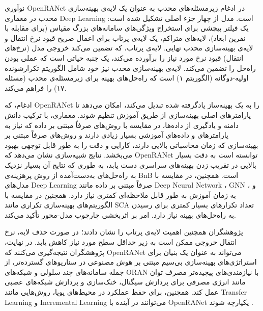 نوآوری OpenRANet در ادغام زیرمسئله‌های محدب به عنوان یک لایه‌ی بهینه‌سازی محدب در معماری 
\gls{Deep Learning}
 است.  مدل از چهار جزء اصلی تشکیل شده است: یک فیلتر پیچشی برای استخراج ویژگی‌های سامانه‌های بزرگ ‌مقیاس (برای مقابله با نفرین ابعاد)، لایه‌های متراکم، یک لایه‌ی پرتاب برای اعمال صریح قیود نرخ انتقال و لایه‌ی بهینه‌سازی محدب نهایی. لایه‌ی پرتاب، که تضمین می‌کند خروجی مدل (نرخ‌های انتقال) قیود نرخ مورد نیاز را برآورده می‌کند، یک جنبه حیاتی است که عملی بودن راه‌حل را تضمین می‌کند. لایه‌ی بهینه‌سازی محدب نیز خود شامل الگوریتم تکرارشونده اولیه-دوگانه (الگوریتم ۱) است که راه‌حل‌های بهینه برای زیرمسئله‌ی محدب (مسئله ۱۷) را فراهم می‌کند.
 
 ادغام، که OpenRANet را به یک بهینه‌ساز یادگرفته شده تبدیل می‌کند، امکان می‌دهد تا پارامترهای اصلی بهینه‌سازی از طریق آموزش تنظیم شوند.  معماری، با ترکیب دانش دامنه و یادگیری از داده‌ها، در مقایسه با روش‌های صرفاً مبتنی بر داده که نیاز به پارامترهای و داده‌های آموزشی بسیار زیادی دارند و روش‌های صرفاً مبتنی بر بهینه‌سازی که زمان محاسباتی بالایی دارند، کارایی و دقت را به طور قابل توجهی بهبود می‌بخشد.
نتایج شبیه‌سازی نشان می‌دهد که OpenRANet توانسته‌ است به دقت بسیار بالایی در تقریب زدن بهینه‌های سراسری دست یابد، به طوری که نتایج آن بسیار نزدیک به راه‌حل‌های به‌دست‌آمده از روش پرهزینه‌ی 
\gls{BnB}
است. همچنین، در مقایسه با مدل‌های 
\gls{Deep Learning}
 صرفاً مبتنی بر داده مانند 
\gls{Deep Neural Network}
،
\gls{GNN} و 
، 
 به زمان آموزش به طور قابل ملاحظه‌ای کمتری نیاز دارد. همچنین 
  در مقایسه با الگوریتم‌های بهینه‌سازی تکراری مانند 
\gls{SCA}
تعداد تکرارهای بسیار کمتری برای رسیدن به راه‌حل‌های بهینه نیاز دارد.  امر بر اثربخشی چارچوب مدل-محور تأکید می‌کند. 

پژوهشگران همچنین اهمیت لایه‌ی پرتاب را نشان دادند؛ در صورت حذف  لایه، نرخ انتقال خروجی ممکن است به زیر حداقل سطح مورد نیاز کاهش یابد.
در نهایت، پژوهشگران نتیجه‌گیری می‌کنند که OpenRANet می‌تواند به عنوان یک بنیان برای استراتژی‌های بهینه‌سازی بی‌سیم مبتنی بر هوش مصنوعی در سناریوهای گسترده‌تر، از جمله سامانه‌های چند-سلولی و شبکه‌های ORAN با نیازمندی‌های پیچیده‌تر مصرف توان مانند انرژی مصرفی برای پردازش سیگنال، خنک‌سازی و پردازش شبکه‌های عصبی عمل کند. همچنین، برای حفظ عملکرد در محیط‌های پویا، روش‌هایی مانند 
\gls{Transfer Learning}
 و 
\gls{Incremental Learning}
 می‌توانند در آینده با OpenRANet یکپارچه شوند
\cite{OptimizingWireless}.

